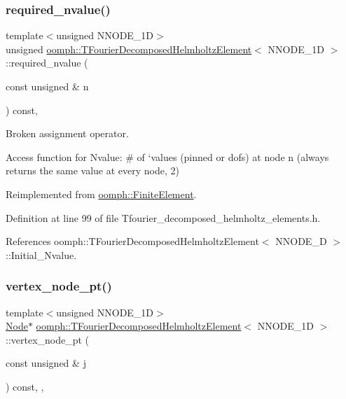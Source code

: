 \subsubsection{\texorpdfstring{required\+\_\+nvalue()}{required\_nvalue()}}
{\footnotesize\ttfamily template$<$unsigned N\+N\+O\+D\+E\+\_\+1D$>$ \\
unsigned \hyperlink{classoomph_1_1TFourierDecomposedHelmholtzElement}{oomph\+::\+T\+Fourier\+Decomposed\+Helmholtz\+Element}$<$ N\+N\+O\+D\+E\+\_\+1D $>$\+::required\+\_\+nvalue (\begin{DoxyParamCaption}\item[{const unsigned \&}]{n }\end{DoxyParamCaption}) const\hspace{0.3cm}{\ttfamily [inline]}, {\ttfamily [virtual]}}



Broken assignment operator. 

Access function for Nvalue\+: \# of `values\textquotesingle{} (pinned or dofs) at node n (always returns the same value at every node, 2) 

Reimplemented from \hyperlink{classoomph_1_1FiniteElement_a56610c60d5bc2d7c27407a1455471b1a}{oomph\+::\+Finite\+Element}.



Definition at line 99 of file Tfourier\+\_\+decomposed\+\_\+helmholtz\+\_\+elements.\+h.



References oomph\+::\+T\+Fourier\+Decomposed\+Helmholtz\+Element$<$ N\+N\+O\+D\+E\+\_\+D $>$\+::\+Initial\+\_\+\+Nvalue.

\mbox{\label{classoomph_1_1TFourierDecomposedHelmholtzElement_af9a1fdd4bce10f5ed815d4c2ec541670}} 
\subsubsection{\texorpdfstring{vertex\+\_\+node\+\_\+pt()}{vertex\_node\_pt()}}
{\footnotesize\ttfamily template$<$unsigned N\+N\+O\+D\+E\+\_\+1D$>$ \\
\hyperlink{classoomph_1_1Node}{Node}$\ast$ \hyperlink{classoomph_1_1TFourierDecomposedHelmholtzElement}{oomph\+::\+T\+Fourier\+Decomposed\+Helmholtz\+Element}$<$ N\+N\+O\+D\+E\+\_\+1D $>$\+::vertex\+\_\+node\+\_\+pt (\begin{DoxyParamCaption}\item[{const unsigned \&}]{j }\end{DoxyParamCaption}) const\hspace{0.3cm}{\ttfamily [inline]}, {\ttfamily [protected]}, {\ttfamily [virtual]}}



